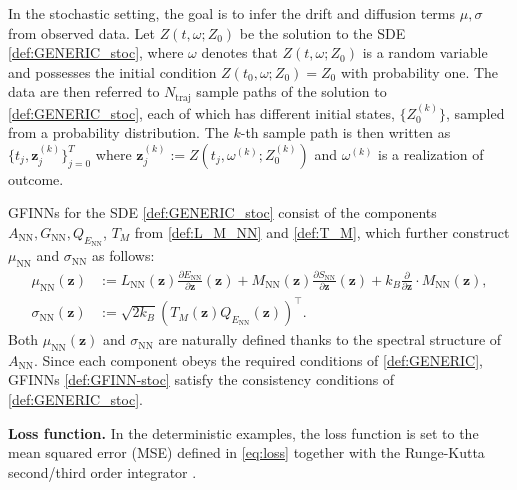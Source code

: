 \documentclass[openacc]{rsproca_new}%
\newcommand{\z}{\bm{z}}
\begin{document}
In the stochastic setting, the goal is to infer the drift and diffusion terms $\mu, \sigma$ 
from observed data. 
Let $Z(t,\omega;Z_0)$
be the solution to the SDE \eqref{def:GENERIC_stoc},
where $\omega$ denotes that $Z(t,\omega;Z_0)$ is a random variable and possesses the initial condition $Z(t_0,\omega;Z_0) = Z_0$
with probability one.
The data are then referred to 
$N_{\text{traj}}$ sample paths
of the solution to \eqref{def:GENERIC_stoc},
each of which has 
different initial states, $\{Z_0^{(k)}\}$, 
sampled from a probability distribution.
The $k$-th sample path is then written as 
$\{t_j, \z_j^{(k)}\}_{j=0}^{T}$
where 
$\z_j^{(k)}:=Z(t_j,\omega^{(k)};Z_0^{(k)})$
and $\omega^{(k)}$ is a realization of outcome.

GFINNs for the SDE \eqref{def:GENERIC_stoc} consist of 
the components $A_{\text{NN}}, G_{\text{NN}}, Q_{E_{\text{NN}}}$, $T_M$ from \eqref{def:L_M_NN} and \eqref{def:T_M},
which further construct 
$\mu_{\text{NN}}$ and  $\sigma_{\text{NN}}$
as follows:
\begin{equation} \label{def:GFINN-stoc}
    \begin{split}
        \mu_{\text{NN}}(\z) &:= L_{\text{NN}}(\z)\frac{\partial E_{\text{NN}}}{\partial \z}(\z) + M_{\text{NN}}(\z)\frac{\partial S_{\text{NN}}}{\partial \z}(\z) + k_B\frac{\partial}{\partial \z}\cdot M_{\text{NN}}(\z),
        \\
        \sigma_{\text{NN}}(\z) &:=\sqrt{2k_B}(T_M(\z)Q_{E_{\text{NN}}}(\z))^\top.
    \end{split}
\end{equation}
Both $\mu_{\text{NN}}(\z)$ and $\sigma_{\text{NN}}$ are naturally defined thanks to the spectral structure of $A_\text{NN}$. 
Since each component obeys the required conditions of \eqref{def:GENERIC},
GFINNs \eqref{def:GFINN-stoc} satisfy the consistency conditions of \eqref{def:GENERIC_stoc}.


\textbf{Loss function.} 
In the deterministic examples, the loss function is set to the mean squared error (MSE) defined in \eqref{eq:loss} 
together with the Runge-Kutta second/third order integrator \cite{lambert1991numerical}.
\end{document}
